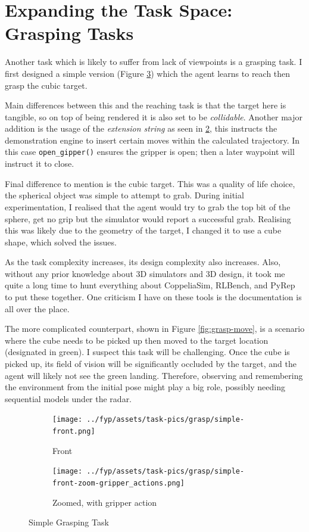 \section{Expanding the Task Space: Grasping Tasks}
Another task which is likely to suffer from lack of viewpoints is a grasping task. I first designed
a simple version (Figure \ref{fig:grasp-simple}) which the agent learns to reach then grasp the cubic target. 

Main differences between this and the reaching task is that the target here is tangible, so on top of being rendered it is also set to be \emph{collidable}. Another major addition is the usage of the \emph{extension string} as seen in \ref{subfig:simple-zoom-actions}, this instructs the demonstration engine to insert certain moves within the calculated trajectory. In this case \verb|open_gipper()| ensures the gripper is open; then a later waypoint will instruct it to close. 

Final difference to mention is the cubic target. This was a quality of life choice, the spherical object was simple to attempt to grab. During initial experimentation, I realised that the agent would try to grab the top bit of the sphere, get no grip but the simulator would report a successful grab. Realising this was likely due to the geometry of the target, I changed it to use a cube shape, which solved the issues.\todo[color=purple]{}

As the task complexity increases, its design complexity also increases. Also, without any prior knowledge about 3D simulators and 3D design, it took me quite a long time to hunt everything about CoppeliaSim, RLBench, and PyRep to put these together. One criticism I have on these tools is the documentation is all over the place. 

The more complicated counterpart, shown in Figure \ref{fig:grasp-move}, is a scenario where the cube needs to be picked up then moved to the target location (designated in green). I suspect this task will be challenging. Once the cube is picked up, its field of vision will be significantly occluded by the target, and the agent will likely not see the green landing. Therefore, observing and remembering the environment from the initial pose might play a big role, possibly needing sequential models under the radar.

\begin{figure}[htpb] %
  \centering
  \begin{subfigure}{0.3\linewidth}
    \centering
    \texttt{[image: ../fyp/assets/task-pics/grasp/simple-front.png]}
    \caption{Front}\label{subfig:simple-front}
  \end{subfigure}
  \begin{subfigure}{0.5\linewidth}
    \centering
    \texttt{[image: ../fyp/assets/task-pics/grasp/simple-front-zoom-gripper\_actions.png]}
    \caption{Zoomed, with gripper action}\label{subfig:simple-zoom-actions}
  \end{subfigure}
  \caption{Simple Grasping Task}\label{fig:grasp-simple}
\end{figure}

